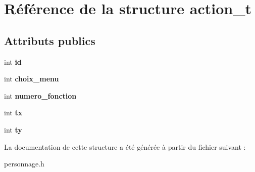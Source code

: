 \hypertarget{structaction__t}{}\section{Référence de la structure action\+\_\+t}
\label{structaction__t}
\subsection*{Attributs publics}
\begin{DoxyCompactItemize}
\item 
\mbox{\label{structaction__t_ad9556abceaadb0792089912b7ae4d90b}} 
int {\bfseries id}
\item 
\mbox{\label{structaction__t_af59c941a3126efbeca39d8d5c19b7f14}} 
int {\bfseries choix\+\_\+menu}
\item 
\mbox{\label{structaction__t_ad3df49c95161be7f468844b7fb1f5023}} 
int {\bfseries numero\+\_\+fonction}
\item 
\mbox{\label{structaction__t_ad387b19bbf9f725886945f4c5a608a87}} 
int {\bfseries tx}
\item 
\mbox{\label{structaction__t_ae76721315880be3b894e75878d1e77ab}} 
int {\bfseries ty}
\end{DoxyCompactItemize}


La documentation de cette structure a été générée à partir du fichier suivant \+:\begin{DoxyCompactItemize}
\item 
personnage.\+h\end{DoxyCompactItemize}
